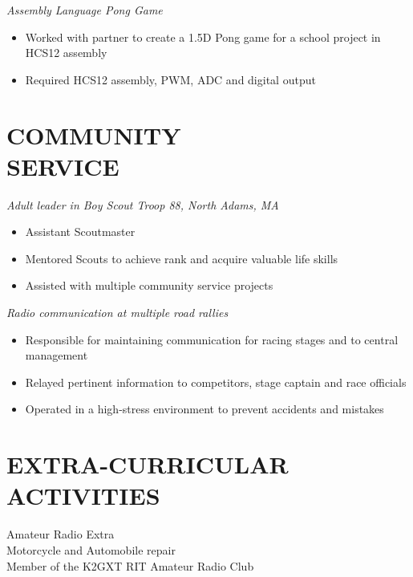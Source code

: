 \documentclass[line,margin]{res}
\begin{document}
\begin{resume}
	\vspace{-10pt}
	{\sl Assembly Language Pong Game}
		\begin{itemize} \itemsep -2pt
			\item Worked with partner to create a 1.5D Pong game for a school project in HCS12 assembly
			\item Required HCS12 assembly, PWM, ADC and digital output
		\end{itemize}
\section{COMMUNITY \\ SERVICE}  
{\sl	Adult leader in Boy Scout Troop 88, North Adams, MA}
	\begin{itemize}  \itemsep -2pt %
		\item Assistant Scoutmaster
		\item Mentored Scouts to achieve rank and acquire valuable life skills%
		\item Assisted with multiple community service projects
	\end{itemize}
	\vspace{-5pt}
	{\sl	Radio communication at multiple road rallies}
	\begin{itemize}  \itemsep -2pt %
		\item Responsible for maintaining communication for racing stages and to central management
		\item Relayed pertinent information to competitors, stage captain and race officials
		\item Operated in a high-stress environment to prevent accidents and mistakes		
	\end{itemize}

\section{EXTRA-CURRICULAR \\ ACTIVITIES}             
	Amateur Radio Extra\\
	Motorcycle and Automobile repair\\
	Member of the K2GXT RIT Amateur Radio Club\\


\end{resume}
\end{document}
